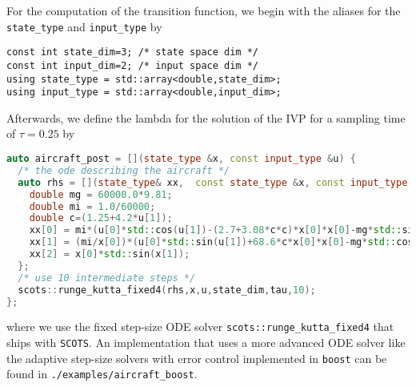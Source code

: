 \documentclass[a4paper]{amsart}
\begin{document}
For the computation of the transition function, we begin with the aliases for the {\tt state\_type} and {\tt input\_type} by
\begin{lstlisting}[basicstyle=\small\ttfamily]
const int state_dim=3; /* state space dim */
const int input_dim=2; /* input space dim */
using state_type = std::array<double,state_dim>;
using input_type = std::array<double,input_dim>;
\end{lstlisting}
Afterwards, we define the lambda for the solution of the IVP for a
sampling time of $\tau=0.25$ by
\begin{lstlisting}[basicstyle=\small\ttfamily, language=C++]
auto aircraft_post = [](state_type &x, const input_type &u) {
  /* the ode describing the aircraft */
  auto rhs = [](state_type& xx,  const state_type &x, const input_type &u) {
    double mg = 60000.0*9.81;
    double mi = 1.0/60000;
    double c=(1.25+4.2*u[1]);
    xx[0] = mi*(u[0]*std::cos(u[1])-(2.7+3.08*c*c)*x[0]*x[0]-mg*std::sin(x[1]));
    xx[1] = (mi/x[0])*(u[0]*std::sin(u[1])+68.6*c*x[0]*x[0]-mg*std::cos(x[1]));
    xx[2] = x[0]*std::sin(x[1]);
  };
  /* use 10 intermediate steps */
  scots::runge_kutta_fixed4(rhs,x,u,state_dim,tau,10);
};
\end{lstlisting}
where we use the fixed step-size ODE solver {\tt scots::runge\_kutta\_fixed4} that
ships with {\tt SCOTS}. An implementation that uses a more advanced ODE solver like the
adaptive step-size solvers with error control implemented in {\tt boost} can be found in {\tt ./examples/aircraft\_boost}.
\end{document}
